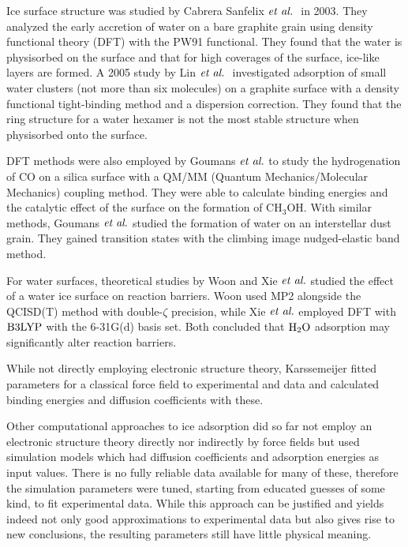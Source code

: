 Ice surface structure was studied by Cabrera Sanfelix $\emph{et al.}~$ 
in 2003.\cite{CabreraSanfelix2003} They analyzed the early accretion of water
on a bare graphite grain using density functional theory (DFT) with the PW91
functional.\cite{PerdewWang1986,PerdewWang1992} They found that the water is
physisorbed on the surface and that for high coverages of the surface, ice-like
layers are formed. A 2005 study by Lin $\emph{et al.}~$
investigated adsorption of small water clusters (not more than six molecules)
on a graphite surface with a density functional tight-binding method and a
dispersion correction. They found that the ring structure for a water hexamer
is not the most stable structure when physisorbed onto the
surface.\cite{LinZhangLeeEtAl2005}

DFT methods were also employed by Goumans $\emph{et al.}$ to study the hydrogenation of
CO on a silica surface with a QM/MM (Quantum Mechanics/Molecular
Mechanics) coupling method.
They were able to calculate binding energies and the catalytic effect of the
surface on the formation of CH$_3$OH.\cite{GoumansCatlowBrown2008} With similar
methods, Goumans $\emph{et al.}$  studied the formation of water on an
interstellar dust grain.\cite{GoumansCatlowBrownEtAl2009} They gained transition
states with the climbing image nudged-elastic band method\cite{HenkelmanUberuagaJonsson2000}.

For water surfaces, theoretical studies by Woon\cite{Woon2002}
and Xie $\emph{et al.}$\cite{XieDingSun2006} studied the effect of a water ice surface
on reaction barriers. Woon used MP2 \cite{MP2} alongside the QCISD(T)
\cite{QCISD} method with double-$\zeta$ precision, while Xie $\emph{et al.}$
employed DFT with $\text{B3LYP}$ with the 6-31G(d) basis set. Both concluded that
$\text H _2 \text O$ adsorption may significantly alter reaction barriers.

While not directly employing electronic structure theory, Karssemeijer fitted
parameters for a classical force field to experimental and  data
and calculated binding energies and diffusion coefficients with
these.\cite{KarssemeijerPedersenJonssonEtAl2012}

Other computational approaches to ice adsorption did so far not employ an
electronic structure theory directly nor indirectly by force fields but used
simulation models which had diffusion coefficients and adsorption energies as input values. There is no
fully reliable data available for many of these, therefore the simulation
parameters were tuned, starting from educated guesses of some kind, to fit
experimental data. While this approach can be justified and yields indeed not
only good approximations to experimental data but also gives rise to new conclusions,
the resulting parameters still have little physical meaning.

